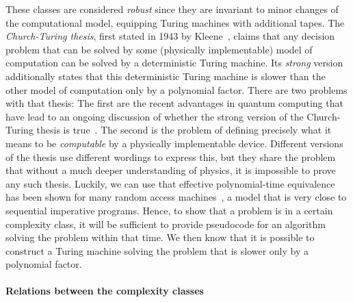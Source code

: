 \documentclass[../../diss.tex]{subfiles}
\begin{document}
These classes are considered \emph{robust} since they are invariant to minor changes of the computational model, \eg equipping Turing machines with additional tapes.
The \emph{Church-Turing thesis}, first stated in 1943 by Kleene~\cite{Kleene43}, claims that any decision problem that can be solved by some (physically implementable) model of computation can be solved by a deterministic Turing machine.
Its \emph{strong} version additionally states that this deterministic Turing machine is slower than the other model of computation only by a polynomial factor.
There are two problems with that thesis:
The first are the recent advantages in quantum computing that have lead to an ongoing discussion of whether the strong version of the Church-Turing thesis is true~\cite{BernsteinV93,KayeLM07}.
The second is the problem of defining precisely what it means to be \emph{computable} by a physically implementable device.
Different versions of the thesis use different wordings to express this, but they share the problem that without a much deeper understanding of physics, it is impossible to prove any such thesis.
Luckily, we can use that effective polynomial-time equivalence has been shown for many random access machines~\cite{CookR72}, a model that is very close to sequential imperative programs.
Hence, to show that a problem is in a certain complexity class, it will be sufficient to provide pseudocode for an algorithm solving the problem within that time.
We then know that it is possible to construct a Turing machine solving the problem that is slower only by a polynomial factor.

\paragraph{Relations between the complexity classes}
\end{document}
